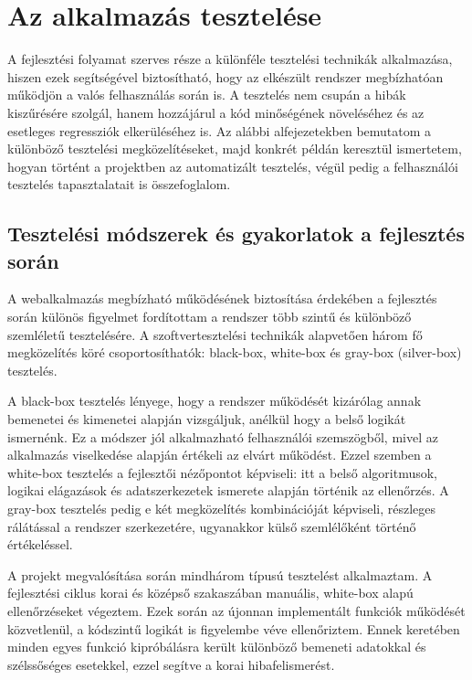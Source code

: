 \section{Az alkalmazás tesztelése}

A fejlesztési folyamat szerves része a különféle tesztelési technikák alkalmazása, hiszen ezek segítségével biztosítható, hogy az elkészült rendszer megbízhatóan működjön a valós felhasználás során is. A tesztelés nem csupán a hibák kiszűrésére szolgál, hanem hozzájárul a kód minőségének növeléséhez és az esetleges regressziók elkerüléséhez is. Az alábbi alfejezetekben bemutatom a különböző tesztelési megközelítéseket, majd konkrét példán keresztül ismertetem, hogyan történt a projektben az automatizált tesztelés, végül pedig a felhasználói tesztelés tapasztalatait is összefoglalom.

\subsection{Tesztelési módszerek és gyakorlatok a fejlesztés során}

A webalkalmazás megbízható működésének biztosítása érdekében a fejlesztés során különös figyelmet fordítottam a rendszer több szintű és különböző szemléletű tesztelésére. A szoftvertesztelési technikák alapvetően három fő megközelítés köré csoportosíthatók: black-box, white-box és gray-box (silver-box) tesztelés.

A black-box tesztelés lényege, hogy a rendszer működését kizárólag annak bemenetei és kimenetei alapján vizsgáljuk, anélkül hogy a belső logikát ismernénk. Ez a módszer jól alkalmazható felhasználói szemszögből, mivel az alkalmazás viselkedése alapján értékeli az elvárt működést. Ezzel szemben a white-box tesztelés a fejlesztői nézőpontot képviseli: itt a belső algoritmusok, logikai elágazások és adatszerkezetek ismerete alapján történik az ellenőrzés. A gray-box tesztelés pedig e két megközelítés kombinációját képviseli, részleges rálátással a rendszer szerkezetére, ugyanakkor külső szemlélőként történő értékeléssel.

A projekt megvalósítása során mindhárom típusú tesztelést alkalmaztam. A fejlesztési ciklus korai és középső szakaszában manuális, white-box alapú ellenőrzéseket végeztem. Ezek során az újonnan implementált funkciók működését közvetlenül, a kódszintű logikát is figyelembe véve ellenőriztem. Ennek keretében minden egyes funkció kipróbálásra került különböző bemeneti adatokkal és szélssőséges esetekkel, ezzel segítve a korai hibafelismerést.

